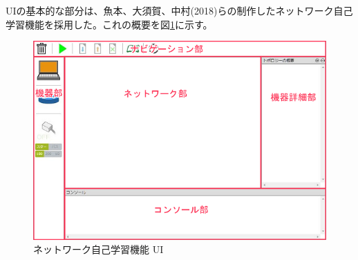 \label{tag:ui}
UIの基本的な部分は、魚本、大須賀、中村(2018)らの制作したネットワーク自己学習機能を採用した。これの概要を図\ref{fig:simu}に示す。

\begin{figure}[htbp]
  \begin{center}
    \includegraphics[scale=0.3]{img/simu.png}
    \caption{ネットワーク自己学習機能 UI}
    \label{fig:simu}
  \end{center}
\end{figure}

